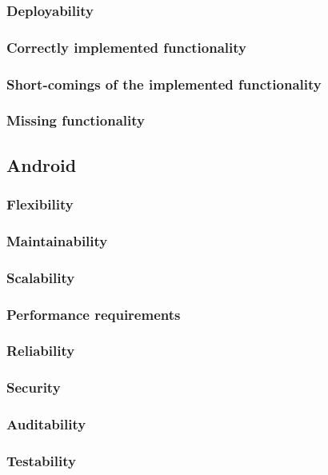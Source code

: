 \documentclass{article}
\begin{document}
        \subsubsection{Deployability}
        \subsubsection{Correctly implemented functionality}
        \subsubsection{Short-comings of the implemented functionality}
        \subsubsection{Missing functionality}
\subsection{Android}
        \subsubsection{Flexibility}
        \subsubsection{Maintainability}
        \subsubsection{Scalability}
        \subsubsection{Performance requirements}
        \subsubsection{Reliability}
        \subsubsection{Security}
        \subsubsection{Auditability}
        \subsubsection{Testability}
\end{document}
